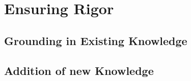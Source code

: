 \section{Ensuring Rigor}


\subsection{Grounding in Existing Knowledge}

\subsection{Addition of new Knowledge}
